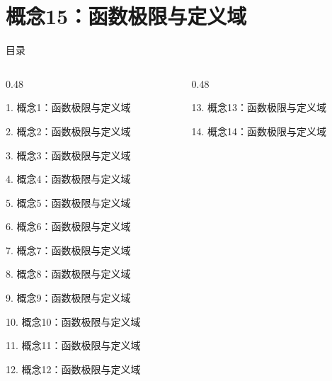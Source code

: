 \documentclass[aspectratio=169,10pt,fontset=fandol]{ctexbeamer}
\begin{document}
\section{概念15：函数极限与定义域}
\begin{frame}[t,fragile]{目录}
\small
\begin{columns}[T,onlytextwidth]
\begin{column}{0.48\textwidth}
{\color{black}\small 1. 概念1：函数极限与定义域\par}\vspace{0.22em}
{\color{black}\small 2. 概念2：函数极限与定义域\par}\vspace{0.22em}
{\color{black}\small 3. 概念3：函数极限与定义域\par}\vspace{0.22em}
{\color{black}\small 4. 概念4：函数极限与定义域\par}\vspace{0.22em}
{\color{black}\small 5. 概念5：函数极限与定义域\par}\vspace{0.22em}
{\color{black}\small 6. 概念6：函数极限与定义域\par}\vspace{0.22em}
{\color{black}\small 7. 概念7：函数极限与定义域\par}\vspace{0.22em}
{\color{black}\small 8. 概念8：函数极限与定义域\par}\vspace{0.22em}
{\color{black}\small 9. 概念9：函数极限与定义域\par}\vspace{0.22em}
{\color{black}\small 10. 概念10：函数极限与定义域\par}\vspace{0.22em}
{\color{black}\small 11. 概念11：函数极限与定义域\par}\vspace{0.22em}
{\color{black}\small 12. 概念12：函数极限与定义域\par}\vspace{0.22em}
\end{column}
\begin{column}{0.48\textwidth}
{\color{black}\small 13. 概念13：函数极限与定义域\par}\vspace{0.22em}
{\color{black}\small 14. 概念14：函数极限与定义域\par}\vspace{0.22em}

\end{column}
\end{columns}
\end{frame}
\end{document}
